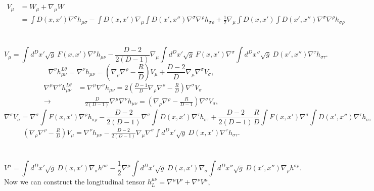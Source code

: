 \documentclass[10pt,letterpaper]{article}
\begin{document}
\begin{align}
V_{\mu} &= W_\mu + \nabla_\mu W
\\
&=  \int D(x,x')\nabla^\sigma h_{\mu\sigma} - \int D(x,x') \nabla_\mu \int D(x',x'')\nabla^\sigma \nabla^\rho h_{\sigma\rho} + \frac{1}{2}\nabla_\mu 
\int D(x,x') \int D(x',x'') \nabla^\sigma \nabla^\rho h_{\sigma\rho}
\end{align}
\\ \\
\begin{equation}
V_\mu =   \int d^Dx' \sqrt{g}\ F(x,x') \nabla^\nu h_{\mu\nu}- \frac{D-2}{2(D-1)}  \nabla_\mu \int d^Dx' \sqrt{g}\ F(x,x') \nabla^\sigma  \int d^Dx'' \sqrt{g}\ D(x',x'') \nabla^\tau h_{\sigma\tau}.
\end{equation}
\begin{equation}
\nabla^\nu h_{\mu\nu}^{L\theta} = \nabla^\nu h_{\mu\nu}= \left( \nabla_\rho \nabla^\rho - \frac{R}{D}\right) V_\mu + \frac{D-2}{D} \nabla_\mu \nabla^\sigma V_\sigma,
\end{equation}
\begin{align}
\nabla^\mu \nabla^\nu h_{\mu\nu}^{L\theta} &=\nabla^\mu \nabla^\nu h_{\mu\nu}= 2\left(\frac{D-1}{D}\nabla_\rho \nabla^\rho - \frac{R}{D}\right) \nabla^\sigma V_\sigma 
\nonumber
\\
\to& \quad \frac{D}{2(D-1)}\nabla^\mu \nabla^\nu h_{\mu\nu}  = \left( \nabla_\rho \nabla^\rho - \frac{R}{D-1}\right)\nabla^\sigma V_\sigma,
\end{align}
\begin{equation}
\nabla^\sigma V_\sigma = \nabla^\sigma \int F(x,x') \nabla^\rho h_{\sigma\rho} - \frac{D-2}{2(D-1)} \nabla^\sigma \int D(x,x') \nabla^\tau h_{\sigma\tau}
+\frac{D-2}{2(D-1)} \frac{R}{D} \int F(x,x') \nabla^\sigma \int D(x',x'') \nabla^\tau h_{\sigma\tau}
\end{equation}
\begin{align}
\left( \nabla_\rho \nabla^\rho - \frac{R}{D}\right) V_\mu 
= \nabla^\nu h_{\mu\nu} - \frac{D-2}{2(D-1)}\nabla_\mu \nabla^\sigma \int d^Dx' \sqrt{g}\ D(x,x') \nabla^\tau h_{\sigma\tau}.
\end{align}
\\ \\
\begin{equation}
V^{\mu} =   \int d^Dx' \sqrt{g}\ D(x,x') \nabla_\sigma h^{\mu\sigma} - \frac12\nabla^\mu 
  \int d^Dx' \sqrt{g}\ D(x,x')\nabla_\sigma   \int d^Dx'' \sqrt{g}\ D(x',x'') \nabla_\rho h^{\sigma\rho}.
\end{equation}
Now we can construct the longitudinal tensor $h^{\mu\nu}_L = \nabla^\mu V^\nu + \nabla^\nu V^\mu$, 
\end{document}
